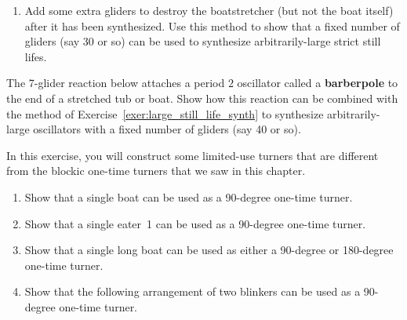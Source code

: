 \begin{multicols}{2}
\begin{problemstar}
\begin{enumerate}[label=\bf\color{ocre}(\alph*)]
			\item {} Add some extra gliders to destroy the boatstretcher (but not the boat itself) after it has been synthesized. Use this method to show that a fixed number of gliders (say 30 or so) can be used to synthesize arbitrarily-large strict still lifes.
		\end{enumerate}
	\end{problemstar}
	
	
	\mfilbreak
	
	
	\begin{problem}\label{exer:large_oscillator_synth} 
		The 7-glider reaction below attaches a period $2$ oscillator called a \textbf{barberpole} to the end of a stretched tub or boat. Show how this reaction can be combined with the method of Exercise~\ref{exer:large_still_life_synth} to synthesize arbitrarily-large oscillators with a fixed number of gliders (say 40 or so).
		
		\begin{center}
		\end{center}
	\end{problem}
	
	
	\mfilbreak
	
	
	\begin{problemstar}\label{exer:boat_one_time_turner} 
		In this exercise, you will construct some limited-use turners that are different from the blockic one-time turners that we saw in this chapter.\smallskip
		
		\begin{enumerate}[label=\bf\color{ocre}(\alph*)]
			\item Show that a single boat can be used as a 90-degree one-time turner.
			
			\item Show that a single eater~1 can be used as a 90-degree one-time turner.
			
			\item Show that a single long boat can be used as either a 90-degree or 180-degree one-time turner.
			
			\item Show that the following arrangement of two blinkers can be used as a 90-degree one-time turner.
			\begin{center}
			\end{center}
		\end{enumerate}
	\end{problemstar}
	

\end{multicols}

